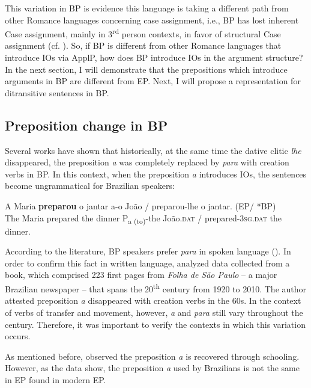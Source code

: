 \documentclass[output=paper,colorlinks,citecolor=brown,nonflat]{./langscibook}
\begin{document}
This variation in BP is evidence this language is taking a different path from other Romance languages concerning case assignment, i.e., BP has lost inherent Case assignment, mainly in 3\textsuperscript{rd} person contexts, in favor of structural Case assignment (cf. \citealt{Calindro2015, CarvalhoCalindro2018}). So, if BP is different from other Romance languages that introduce IOs via ApplP, how does BP introduce IOs in the argument structure? In the next section, I will demonstrate that the prepositions which introduce arguments in BP are different from EP. Next, I will propose a representation for ditransitive sentences in BP.

\subsection{Preposition change in BP}\label{sec:calindro:2.1}

Several works have shown that historically, at the same time the dative clitic \textit{lhe} disappeared, the preposition \textit{a} was completely replaced by \textit{para} with creation verbs in BP. In this context, when the preposition \textit{a} introduces IOs, the sentences become ungrammatical for Brazilian speakers: 

\ea%
    \label{ex:calindro:11}
    \gll A   Maria \textbf{preparou} o jantar     a-o {João} / preparou-lhe o jantar.   \hspace*{21em}   (EP/ *BP) \\
    The Maria prepared  the dinner  P{\textsubscript{a (to)}}-the João.\textsc{dat} / prepared-\textsc{3sg.dat} the dinner. \\
    \z

According to the literature, BP speakers prefer \textit{para} in spoken language (\citealt{TorresMoraisBerlinck2007}). In order to confirm this fact in written language, \citet{Calindro2015} analyzed data collected from a book, which comprised 223 first pages from \textit{Folha de São Paulo} – a major Brazilian newspaper – that spans the 20\textsuperscript{th} century from 1920 to 2010. The author attested preposition \textit{a} disappeared with creation verbs in the 60s. In the context of verbs of transfer and movement, however, \textit{a} and \textit{para} still vary throughout the century. Therefore, it was important to verify the contexts in which this variation occurs.

As mentioned before, \citet{Kato2005} observed the preposition \textit{a} is recovered through schooling. However, as the data show, the preposition \textit{a} used by Brazilians is not the same in EP found in modern EP. 
\end{document}
